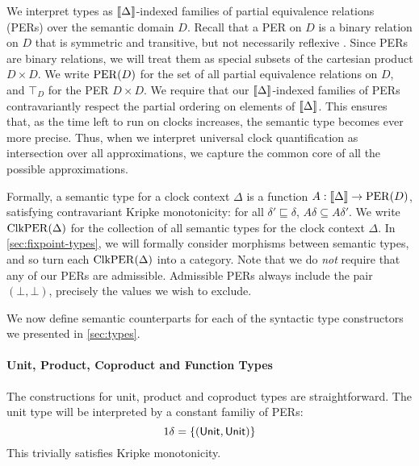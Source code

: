 We interpret types as $\llbracket \Delta \rrbracket$-indexed families of partial
equivalence relations (PERs) over the semantic domain $D$. Recall that
a PER on $D$ is a binary relation on $D$ that is symmetric and
transitive, but not necessarily reflexive \cite{mitchell}. Since PERs
are binary relations, we will treat them as special subsets of the
cartesian product $D \times D$. We write $\mathrm{PER}(D)$ for the set of all
partial equivalence relations on $D$, and $\top_D$ for the PER $D
\times D$.  We require that our $\llbracket \Delta \rrbracket$-indexed families of
PERs contravariantly respect the partial ordering on elements of
$\llbracket \Delta \rrbracket$. This ensures that, as the time left to run on clocks
increases, the semantic type becomes ever more precise. Thus, when we
interpret universal clock quantification as intersection over all
approximations, we capture the common core of all the possible
approximations.

Formally, a semantic type for a clock context $\Delta$ is a function
$A : \llbracket \Delta \rrbracket \to \mathrm{PER}(D)$, satisfying contravariant Kripke
monotonicity: for all $\delta' \sqsubseteq \delta$, $A\delta \subseteq
A\delta'$. We write $\mathrm{ClkPER}(\Delta)$ for the collection of all
semantic types for the clock context $\Delta$. In
\autoref{sec:fixpoint-types}, we will formally consider morphisms
between semantic types, and so turn each $\mathrm{ClkPER}(\Delta)$ into a
category. Note that we do \emph{not} require that any of our PERs are
admissible. Admissible PERs always include the pair $(\bot,\bot)$,
precisely the values we wish to exclude.

We now define semantic counterparts for each of the syntactic type
constructors we presented in \autoref{sec:types}.

\paragraph{Unit, Product, Coproduct and Function Types}

The constructions for unit, product and coproduct types are
straightforward. The unit type will be interpreted by a constant
familiy of PERs:
\begin{displaymath}
  1\delta = \{(\mathsf{Unit}, \mathsf{Unit})\}
\end{displaymath}
This trivially satisfies Kripke monotonicity.


